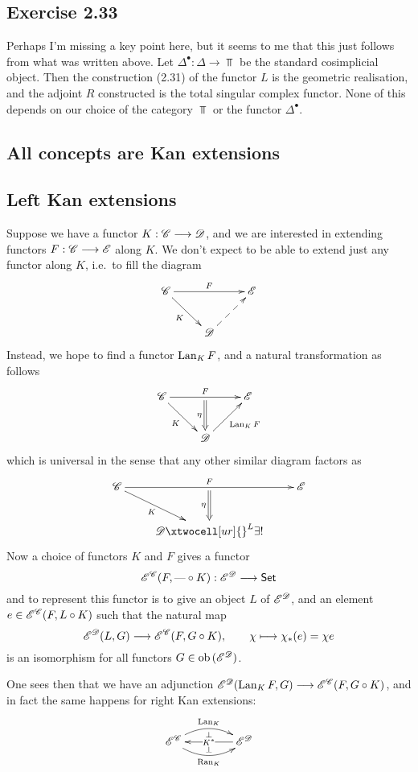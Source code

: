 \documentclass[11pt]{article}
\begin{document}
\begin{solutions}
\subsection*{Exercise 2.33}
Perhaps I'm missing a key point here, but it seems to me that this just follows from what was written above. Let $\Delta^\bullet:\Delta\to\Top$ be the standard cosimplicial object. Then the construction (2.31) of the functor $L$ is the geometric realisation, and the adjoint $R$ constructed is the total singular complex functor. None of this depends on our choice of the category $\Top$ or the functor $\Delta^\bullet$.

\end{solutions}
\begin{2. Kan Extensions}
\section*{All concepts are Kan extensions}
\subsection*{Left Kan extensions}
Suppose we have a functor $K:\mathscr{C}\longrightarrow\mathscr{D}$, and we are interested in extending functors $F:\mathscr{C}\longrightarrow\mathscr{E}$ along $K$. We don't expect to be able to extend just any functor along $K$, i.e.\ to fill the diagram
\[\xymatrix{
\scrC\ar[rr]^-{F}_-{}="1" \ar[rd]_-{K}&%
&%
\scrE\\%
&%
\scrD\ar@{-->}[ru]&%
}\]
Instead, we hope to find a functor $\operatorname{Lan}_KF$, and a natural transformation as follows
\[\xymatrix{
\scrC\ar[rd]_-{K}\ar[rr]^-{F}_-{}="arF"&%
&%
\scrE\\%
&%
\scrD\ar@{->}[ur]_{\Lan_KF}\ar@{=>}"arF";[]_-{\eta}&%
}\]
which is universal in the sense that any other similar diagram factors as
\[\xymatrix{
\scrC\ar[rd]_-{K}\ar[rr]^-{F}_-{}="arF"&%
&%
\scrE\\%
&%
\scrD\ar@{=>}"arF";[]_-{\eta}
\xtwocell[ur]{}^{L}{{\exists!}}&%
}\]
Now a choice of functors $K$ and $F$ gives a functor 
\[\mathscr{E}^{\mathscr{C}}(F,\textup{---}\circ K):\mathscr{E}^{\mathscr{D}}\longrightarrow\operatorname{{\mathsf{Set}}}\]
and to represent this functor is to give an object $L$ of $\mathscr{E}^{\mathscr{D}}$, and an element $e\in \mathscr{E}^{\mathscr{C}}(F,L\circ K)$ such that the natural map
\[\mathscr{E}^{\mathscr{D}}(L,G)\longrightarrow \mathscr{E}^{\mathscr{C}}(F,G\circ K),\qquad \chi\longmapsto \chi_*(e)=\chi e\]
is an isomorphism for all functors $G\in\textup{ob}\,(\mathscr{E}^{\mathscr{D}})$.

One sees then that we have an adjunction $\mathscr{E}^{\mathscr{D}}(\operatorname{Lan}_KF,G)\longrightarrow \mathscr{E}^{\mathscr{C}}(F,G\circ K)$, and in fact the same happens for right Kan extensions:
\[\xymatrix@C=1.5cm{
\scrE^\scrC\ar@/^1.2em/[r]^-{\Lan_K}_-{\perp} \ar@/_1.2em/[r]_-{\Ran_K}^-{\perp}&%
\scrE^\scrD\ar[l]|{K^*}%
}\]

\end{2. Kan Extensions}
\end{document}
